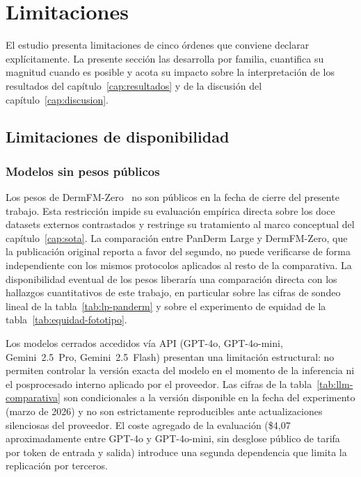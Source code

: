 
\chapter{Limitaciones}
\label{cap:limitaciones}

El estudio presenta limitaciones de cinco órdenes que conviene
declarar explícitamente. La presente sección las desarrolla por
familia, cuantifica su magnitud cuando es posible y acota su
impacto sobre la interpretación de los resultados del
capítulo~\ref{cap:resultados} y de la discusión del
capítulo~\ref{cap:discusion}.

\section{Limitaciones de disponibilidad}
\label{sec:lim-disponibilidad}

\subsection{Modelos sin pesos públicos}
\label{sec:lim-pesos}

Los pesos de DermFM-Zero~\cite{dermfmzero2026} no son públicos en
la fecha de cierre del presente trabajo. Esta restricción impide
su evaluación empírica directa sobre los doce datasets externos
contrastados y restringe su tratamiento al marco conceptual del
capítulo~\ref{cap:sota}. La comparación entre PanDerm Large y
DermFM-Zero, que la publicación original reporta a favor del
segundo, no puede verificarse de forma independiente con los
mismos protocolos aplicados al resto de la comparativa. La
disponibilidad eventual de los pesos liberaría una comparación
directa con los hallazgos cuantitativos de este trabajo, en
particular sobre las cifras de sondeo lineal de la
tabla~\ref{tab:lp-panderm} y sobre el experimento de equidad de
la tabla~\ref{tab:equidad-fototipo}.

Los modelos cerrados accedidos vía API (GPT-4o, GPT-4o-mini,
Gemini~2.5~Pro, Gemini~2.5~Flash) presentan una limitación
estructural: no permiten controlar la versión exacta del modelo en
el momento de la inferencia ni el posprocesado interno aplicado
por el proveedor. Las cifras de la tabla~\ref{tab:llm-comparativa}
son condicionales a la versión disponible en la fecha del
experimento (marzo de 2026) y no son estrictamente reproducibles
ante actualizaciones silenciosas del proveedor. El coste agregado
de la evaluación (\$4{,}07 aproximadamente entre GPT-4o y
GPT-4o-mini, sin desglose público de tarifa por token de entrada y
salida) introduce una segunda dependencia que limita la
replicación por terceros.

